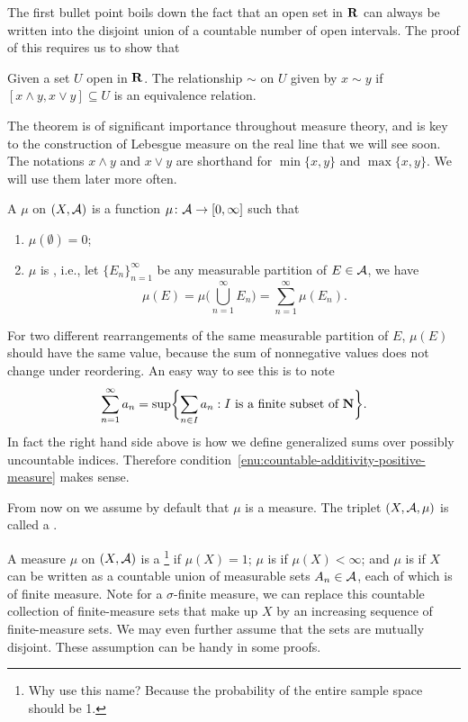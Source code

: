 The first bullet point boils down the fact that an open set in $\mathbf{R}$ can always be written into the disjoint union of a countable number of open intervals. The proof of this requires us to show that 

\begin{xca}
    Given a set $U$ open in $\mathbf{R}$. The relationship $\sim$ on $U$ given by $x \sim y$ if $[x \land y, x \lor y] \subseteq U$ is an equivalence relation.
\end{xca}
The theorem is of significant importance throughout measure theory, and is key to the construction of Lebesgue measure on the real line that we will see soon. The notations $x \land y$ and $x \lor y$ are shorthand for $\min\{x,y\}$ and $\max\{x,y\}$. We will use them later more often.

\begin{defn}
     A  $\mu$ on $(X,\mathcal{A})$ is a function $\mu\colon\mathcal{A}\to[0,\infty]$ such that \begin{enumerate}
         \item $\mu(\emptyset) = 0$;
         \item \label{enu:countable-additivity-positive-measure} $\mu$ is , i.e., let $\{E_n\}_{n=1}^\infty$ be any measurable partition of $E \in \mathcal{A}$, we have  \[
            \mu(E) = \mu\biggl(\bigcup_{n=1}^\infty E_n\biggr) = \sum_{n=1}^\infty \mu(E_n).
         \]
     \end{enumerate}
\end{defn}

For two different rearrangements of the same measurable partition of $E$, $\mu(E)$ should have the same value, because the sum of nonnegative values does not change under reordering. An easy way to see this is to note \[
    \sum_{n=1}^\infty a_n= \sup\biggl\{\sum_{n\in I} a_n:I\text{ is a finite subset of }\mathbf{N}\biggr\}.
\] In fact the right hand side above is how we define generalized sums over possibly uncountable indices. Therefore condition~\ref{enu:countable-additivity-positive-measure} makes sense.

From now on we assume by default that $\mu$ is a measure. The triplet $(X,\mathcal{A},\mu)$ is called a .

A measure $\mu$ on $(X,\mathcal{A})$ is a \footnote{Why use this name? Because the probability of the entire sample space should be 1.} if $\mu(X) = 1$; $\mu$ is  if $\mu(X) < \infty$; and $\mu$ is  if $X$ can be written as a countable union of measurable sets $A_n \in \mathcal{A}$, each of which is of finite measure. Note for a $\sigma$-finite measure, we can replace this countable collection of finite-measure sets that make up $X$ by an increasing sequence of finite-measure sets. We may even further assume that the sets are mutually disjoint. These assumption can be handy in some proofs.


